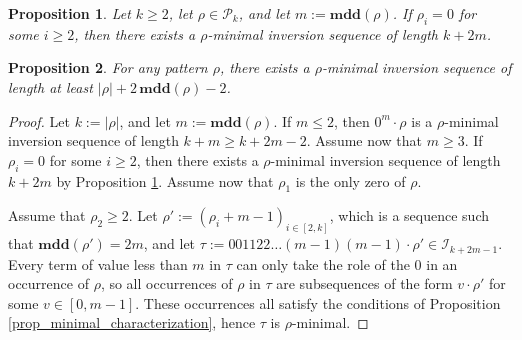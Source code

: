 \documentclass[10pt,a4paper]{amsart}
\newtheorem{prop}{Proposition}
\newcommand{\I}{\mathcal{I}}
\renewcommand{\P}{\mathcal{P}}
\newcommand{\mdd}{\mathbf{mdd}}
\begin{document}
\begin{prop} \label{prop_tight_ub}
    Let $k \geq 2$, let $\rho \in \P_k$, and let $m := \mdd(\rho)$. If $\rho_i = 0$ for some $i \geq 2$, then there exists a $\rho$-minimal inversion sequence of length $k + 2m$.
\end{prop}

\begin{prop} \label{prop_min_max_length}
    For any pattern $\rho$, there exists a $\rho$-minimal inversion sequence of length at least $|\rho| + 2 \, \mdd(\rho) - 2$.
\end{prop}

\begin{proof}
    Let $k := |\rho|$, and let $m := \mdd(\rho)$. If $m \leq 2$, then $0^m \cdot \rho$ is a $\rho$-minimal inversion sequence of length $k + m \geq k + 2m - 2$. Assume now that $m \geq 3$. If $\rho_i = 0$ for some $i \geq 2$, then there exists a $\rho$-minimal inversion sequence of length $k + 2m$ by Proposition \ref{prop_tight_ub}. Assume now that $\rho_1$ is the only zero of $\rho$.

    Assume that $\rho_2 \geq 2$. Let $\rho' := (\rho_i + m - 1)_{i \in[2,k]}$, which is a sequence such that $\mdd(\rho') = 2m$, and let $\tau := 001122 \dots (m-1) (m-1) \cdot \rho' \in \I_{k+2m-1}$. Every term of value less than $m$ in $\tau$ can only take the role of the 0 in an occurrence of $\rho$, so all occurrences of $\rho$ in $\tau$ are subsequences of the form $v \cdot \rho'$ for some $v \in [0,m-1]$. These occurrences all satisfy the conditions of Proposition \ref{prop_minimal_characterization}, hence $\tau$ is $\rho$-minimal.


\end{proof}
\end{document}
